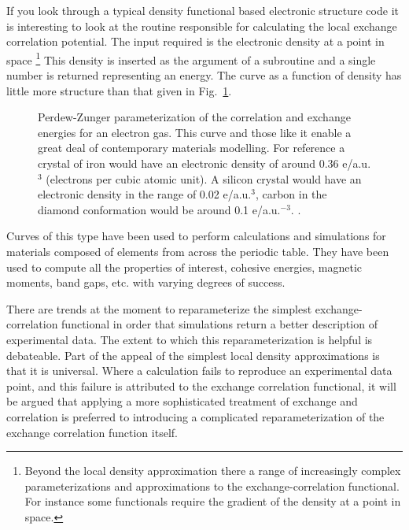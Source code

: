 If you look through a typical density functional based electronic structure code 
it is interesting to look at the routine responsible for calculating 
the local exchange correlation potential. 
The input required is the electronic density at a point in space \footnote{Beyond the local density
approximation there a range of increasingly complex parameterizations and
approximations to the exchange-correlation functional. For instance some functionals
require the gradient of the density at a point in space.} 
This  density is inserted as the argument of a subroutine and a single number is returned
representing an energy. The curve as a function of density 
has little more structure than that given in Fig.~\ref{fig:ldapz}. 
%
\begin{figure}
\begin{center}
\graphicspath{{./intro/}}
\caption{Perdew-Zunger parameterization of the correlation and exchange energies for an electron gas.
This curve and those like it enable a great deal of contemporary materials modelling. For reference
a crystal of iron would have an electronic density of around 0.36 e/a.u.$^{3}$ (electrons per cubic
atomic unit). A silicon crystal would have an electronic density in the range of 0.02 e/a.u.$^{3}$,
carbon in the diamond conformation would be around 0.1 e/a.u.$^{-3}$.  
\label{fig:ldapz}.}
\end{center}
\end{figure}
%
Curves of this type have been used to perform calculations and simulations for 
materials composed of elements from across the periodic table. They have been
used to compute all the properties of interest, cohesive energies, magnetic moments, 
band gaps, etc. with varying degrees of success.

There are trends at the moment to reparameterize the simplest exchange-correlation functional
in order that simulations return a better description of experimental data. The extent
to which this reparameterization is helpful is debateable. 
Part of the appeal of the simplest local density approximations is that it is universal. 
Where a calculation fails to reproduce an experimental data point, and this failure is attributed to the
exchange correlation functional, it will be argued that applying a more sophisticated treatment of exchange
and correlation is preferred to introducing a complicated reparameterization of the exchange correlation
function itself.

